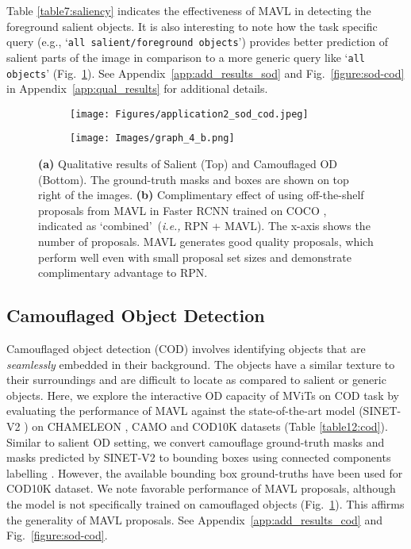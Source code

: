 \documentclass[runningheads]{llncs}
\def\ie{\emph{i.e.,}\xspace} \def\Ie{\emph{I.e.}\xspace}
\newcommand{\txt}[1]{{\texttt{#1}}}
\begin{document}
Table \ref{table7:saliency} indicates the effectiveness of MAVL in detecting the foreground salient objects. It is also interesting to note how the task specific query (e.g., ‘\txt{all salient/foreground objects}') provides better prediction of salient parts of the image in comparison to a more generic query like ‘\txt{all objects}' (Fig.~\ref{fig:appl_2}). See Appendix~\ref{app:add_results_sod} and Fig.~\ref{figure:sod-cod} in Appendix~\ref{app:qual_results} for additional details.
\begin{figure}[!t]
  \centering
  \begin{subfigure}{.5\textwidth}
    \centering
    \texttt{[image: Figures/application2\_sod\_cod.jpeg]}
    \caption{}
    \label{fig:appl_2}
  \end{subfigure}\hfill
  \begin{subfigure}{.48\textwidth}
    \centering
    \texttt{[image: Images/graph\_4\_b.png]}
    \caption{}
    \label{fig:graph_4_rpn}
  \end{subfigure}
\caption{\small
\textbf{\color{blue}(a)} Qualitative results of Salient (Top) and Camouflaged OD (Bottom). The ground-truth masks and boxes are shown on top right of the images. 
\textbf{\color{blue}(b)} 
Complimentary effect of using off-the-shelf proposals from MAVL in Faster RCNN \cite{ren2015faster} trained on COCO \cite{coco}, indicated as \lq combined\rq~(\ie RPN + MAVL). The x-axis shows the number of proposals. MAVL generates good quality proposals, which perform well even with  small proposal set sizes and demonstrate complimentary advantage to RPN.}
\label{fig:6-7_comb}
\end{figure}
\subsection{Camouflaged Object Detection}
Camouflaged object detection (COD) involves identifying objects that are \emph{seamlessly} embedded in their background. The objects have a similar texture to their surroundings and are difficult to locate as compared to salient or generic objects. Here, we explore the interactive OD capacity of MViTs on COD task by evaluating the performance of MAVL against the state-of-the-art model (SINET-V2 \cite{SINET-V2}) on CHAMELEON \cite{CHAMELEON}, CAMO \cite{CAMO} and COD10K \cite{fan2020camouflaged} datasets (Table \ref{table12:cod}). Similar to salient OD setting, we convert camouflage ground-truth masks and masks predicted by SINET-V2 to bounding boxes using connected components labelling \cite{wu2005optimizing}. However, the available bounding box ground-truths have been used for COD10K dataset. 
We note favorable performance of MAVL proposals, although the model is not specifically trained on camouflaged objects (Fig.~\ref{fig:appl_2}). This affirms the generality of MAVL proposals. See Appendix~\ref{app:add_results_cod} and Fig.~\ref{figure:sod-cod}.
\end{document}
